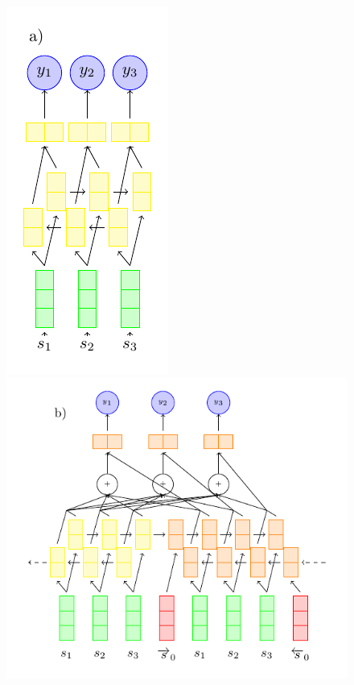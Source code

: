 \begin{figure}
  \center
  \includegraphics[scale=.7]{figures/rnnextractor.pdf}
  \includegraphics[scale=.7]{figures/s2s_extractor.pdf}

\end{figure}
